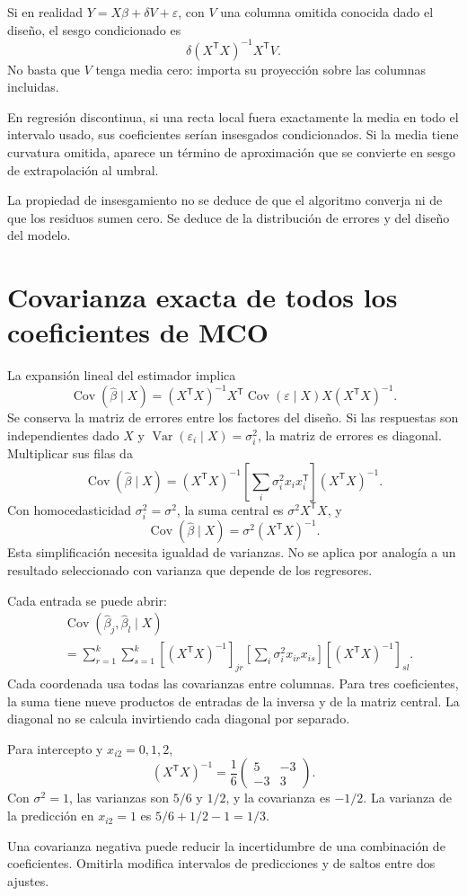 \documentclass[11pt,a4paper]{article}
\newcommand{\T}{^{\mathsf T}}
\DeclareMathOperator{\Var}{Var}
\DeclareMathOperator{\Cov}{Cov}
\begin{document}
\begin{ejemplo}
Si en realidad
\(Y=X\beta+\delta V+\varepsilon\),
con \(V\) una columna omitida conocida dado el diseño,
el sesgo condicionado es
\[
\delta(X\T X)^{-1}X\T V.
\]
No basta que \(V\) tenga media cero:
importa su proyección sobre las columnas incluidas.
\end{ejemplo}
En regresión discontinua, si una recta local fuera
exactamente la media en todo el intervalo usado,
sus coeficientes serían insesgados condicionados.
Si la media tiene curvatura omitida, aparece
un término de aproximación que se convierte
en sesgo de extrapolación al umbral.

La propiedad de insesgamiento no se deduce de que
el algoritmo converja ni de que los residuos
sumen cero. Se deduce de la distribución
de errores y del diseño del modelo.

\clearpage
\section{Covarianza exacta de todos los coeficientes de MCO}\label{unidad10}
La expansión lineal del estimador implica
\[
\Cov(\widehat\beta\mid X)
=(X\T X)^{-1}X\T\Cov(\varepsilon\mid X)X(X\T X)^{-1}.
\]
Se conserva la matriz de errores entre los factores del diseño.
Si las respuestas son independientes dado \(X\)
y \(\Var(\varepsilon_i\mid X)=\sigma_i^2\),
la matriz de errores es diagonal.
Multiplicar sus filas da
\[
\Cov(\widehat\beta\mid X)
=(X\T X)^{-1}
\left[\sum_i\sigma_i^2x_ix_i\T\right](X\T X)^{-1}.
\]
Con homocedasticidad \(\sigma_i^2=\sigma^2\),
la suma central es \(\sigma^2X\T X\), y
\[
\Cov(\widehat\beta\mid X)=\sigma^2(X\T X)^{-1}.
\]
Esta simplificación necesita igualdad de varianzas.
No se aplica por analogía a un resultado seleccionado
con varianza que depende de los regresores.

Cada entrada se puede abrir:
\[
\begin{aligned}
&\Cov(\widehat\beta_j,\widehat\beta_l\mid X)\\
&=\sum_{r=1}^k\sum_{s=1}^k
[(X\T X)^{-1}]_{jr}
\left[\sum_i\sigma_i^2x_{ir}x_{is}\right]
[(X\T X)^{-1}]_{sl}.
\end{aligned}
\]
Cada coordenada usa todas las covarianzas entre columnas.
Para tres coeficientes, la suma tiene nueve productos
de entradas de la inversa y de la matriz central.
La diagonal no se calcula invirtiendo cada diagonal por separado.

\begin{ejemplo}
Para intercepto y \(x_{i2}=0,1,2\),
\[
(X\T X)^{-1}
=\frac16\begin{pmatrix}5&-3\\-3&3\end{pmatrix}.
\]
Con \(\sigma^2=1\), las varianzas son \(5/6\) y \(1/2\),
y la covarianza es \(-1/2\).
La varianza de la predicción en \(x_{i2}=1\) es
\(5/6+1/2-1=1/3\).
\end{ejemplo}
Una covarianza negativa puede reducir la incertidumbre
de una combinación de coeficientes.
Omitirla modifica intervalos de predicciones
y de saltos entre dos ajustes.
\end{document}
